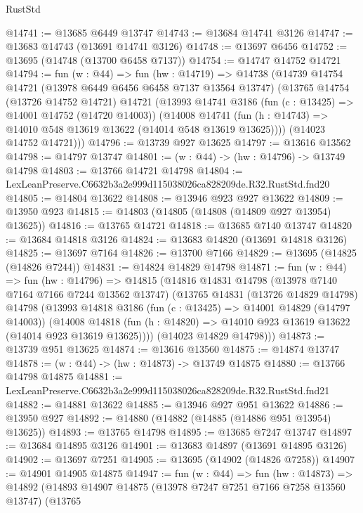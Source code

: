 \begin{lexlean}{RustStd}
\begin{coremodule}
@14741 := @13685 @6449 @13747
@14743 := @13684 @14741 @3126
@14747 := @13683 @14743 (@13691 @14741 @3126)
@14748 := @13697 @6456
@14752 := @13695 (@14748 (@13700 @6458 @7137))
@14754 := @14747 @14752 @14721
@14794 := fun (w : @44) =>
  fun (hw : @14719) =>
  @14738
    (@14739
      @14754
      @14721
      (@13978 @6449 @6456 @6458 @7137 @13564 @13747)
      (@13765
        @14754
        (@13726 @14752 @14721)
        @14721
        (@13993
          @14741
          @3186
          (fun (c : @13425) => @14001 @14752 (@14720 @14003))
          (@14008
            @14741
            (fun (h : @14743) => @14010 @548 @13619 @13622 (@14014 @548 @13619 @13625))))
        (@14023 @14752 @14721)))
@14796 := @13739 @927 @13625
@14797 := @13616 @13562
@14798 := @14797 @13747
@14801 := (w : @44) -> (hw : @14796) -> @13749 @14798
@14803 := @13766 @14721 @14798
@14804 := LexLeanPreserve.C6632b3a2e999d115038026ca828209de.R32.RustStd.fnd20
@14805 := @14804 @13622
@14808 := @13946 @923 @927 @13622
@14809 := @13950 @923
@14815 := @14803 (@14805 (@14808 (@14809 @927 @13954) @13625))
@14816 := @13765 @14721
@14818 := @13685 @7140 @13747
@14820 := @13684 @14818 @3126
@14824 := @13683 @14820 (@13691 @14818 @3126)
@14825 := @13697 @7164
@14826 := @13700 @7166
@14829 := @13695 (@14825 (@14826 @7244))
@14831 := @14824 @14829 @14798
@14871 := fun (w : @44) =>
  fun (hw : @14796) =>
  @14815
    (@14816
      @14831
      @14798
      (@13978 @7140 @7164 @7166 @7244 @13562 @13747)
      (@13765
        @14831
        (@13726 @14829 @14798)
        @14798
        (@13993
          @14818
          @3186
          (fun (c : @13425) => @14001 @14829 (@14797 @14003))
          (@14008
            @14818
            (fun (h : @14820) => @14010 @923 @13619 @13622 (@14014 @923 @13619 @13625))))
        (@14023 @14829 @14798)))
@14873 := @13739 @951 @13625
@14874 := @13616 @13560
@14875 := @14874 @13747
@14878 := (w : @44) -> (hw : @14873) -> @13749 @14875
@14880 := @13766 @14798 @14875
@14881 := LexLeanPreserve.C6632b3a2e999d115038026ca828209de.R32.RustStd.fnd21
@14882 := @14881 @13622
@14885 := @13946 @927 @951 @13622
@14886 := @13950 @927
@14892 := @14880 (@14882 (@14885 (@14886 @951 @13954) @13625))
@14893 := @13765 @14798
@14895 := @13685 @7247 @13747
@14897 := @13684 @14895 @3126
@14901 := @13683 @14897 (@13691 @14895 @3126)
@14902 := @13697 @7251
@14905 := @13695 (@14902 (@14826 @7258))
@14907 := @14901 @14905 @14875
@14947 := fun (w : @44) =>
  fun (hw : @14873) =>
  @14892
    (@14893
      @14907
      @14875
      (@13978 @7247 @7251 @7166 @7258 @13560 @13747)
      (@13765

\end{coremodule}
\end{lexlean}
